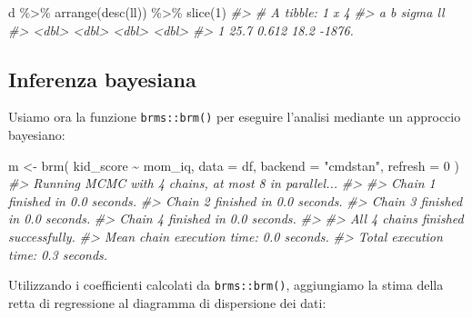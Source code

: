 \documentclass[
  10pt,
  italian,
  a4paper,
  extrafontsizes,onecolumn,openright
  ]{memoir}
\newenvironment{Shaded}{\begin{snugshade}}{\end{snugshade}}
\newcommand{\AttributeTok}[1]{\textcolor[rgb]{0.77,0.63,0.00}{#1}}
\newcommand{\CommentTok}[1]{\textcolor[rgb]{0.56,0.35,0.01}{\textit{#1}}}
\newcommand{\DecValTok}[1]{\textcolor[rgb]{0.00,0.00,0.81}{#1}}
\newcommand{\FunctionTok}[1]{\textcolor[rgb]{0.00,0.00,0.00}{#1}}
\newcommand{\NormalTok}[1]{#1}
\newcommand{\OtherTok}[1]{\textcolor[rgb]{0.56,0.35,0.01}{#1}}
\newcommand{\SpecialCharTok}[1]{\textcolor[rgb]{0.00,0.00,0.00}{#1}}
\newcommand{\StringTok}[1]{\textcolor[rgb]{0.31,0.60,0.02}{#1}}
\begin{document}
\begin{Shaded}
\begin{Highlighting}[]
\NormalTok{d }\SpecialCharTok{\%\textgreater{}\%}
  \FunctionTok{arrange}\NormalTok{(}\FunctionTok{desc}\NormalTok{(ll)) }\SpecialCharTok{\%\textgreater{}\%}
  \FunctionTok{slice}\NormalTok{(}\DecValTok{1}\NormalTok{)}
\CommentTok{\#\textgreater{} \# A tibble: 1 x 4}
\CommentTok{\#\textgreater{}       a     b sigma     ll}
\CommentTok{\#\textgreater{}   \textless{}dbl\textgreater{} \textless{}dbl\textgreater{} \textless{}dbl\textgreater{}  \textless{}dbl\textgreater{}}
\CommentTok{\#\textgreater{} 1  25.7 0.612  18.2 {-}1876.}
\end{Highlighting}
\end{Shaded}

\hypertarget{inferenza-bayesiana}{%
\subsection{Inferenza bayesiana}\label{inferenza-bayesiana}}

Usiamo ora la funzione \texttt{brms::brm()} per eseguire l'analisi mediante un approccio bayesiano:

\begin{Shaded}
\begin{Highlighting}[]
\NormalTok{m }\OtherTok{\textless{}{-}}
  \FunctionTok{brm}\NormalTok{(}
\NormalTok{    kid\_score }\SpecialCharTok{\textasciitilde{}}\NormalTok{ mom\_iq,}
    \AttributeTok{data =}\NormalTok{ df,}
    \AttributeTok{backend =} \StringTok{"cmdstan"}\NormalTok{,}
    \AttributeTok{refresh =} \DecValTok{0}
\NormalTok{  )}
\CommentTok{\#\textgreater{} Running MCMC with 4 chains, at most 8 in parallel...}
\CommentTok{\#\textgreater{} }
\CommentTok{\#\textgreater{} Chain 1 finished in 0.0 seconds.}
\CommentTok{\#\textgreater{} Chain 2 finished in 0.0 seconds.}
\CommentTok{\#\textgreater{} Chain 3 finished in 0.0 seconds.}
\CommentTok{\#\textgreater{} Chain 4 finished in 0.0 seconds.}
\CommentTok{\#\textgreater{} }
\CommentTok{\#\textgreater{} All 4 chains finished successfully.}
\CommentTok{\#\textgreater{} Mean chain execution time: 0.0 seconds.}
\CommentTok{\#\textgreater{} Total execution time: 0.3 seconds.}
\end{Highlighting}
\end{Shaded}

Utilizzando i coefficienti calcolati da \texttt{brms::brm()}, aggiungiamo la stima della retta di regressione al diagramma di dispersione dei dati:
\end{document}
